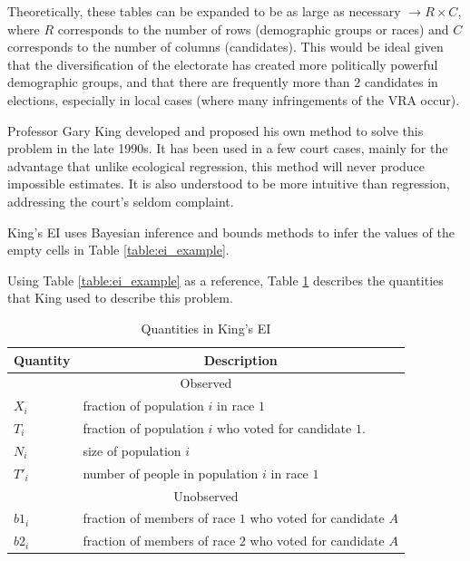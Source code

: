 Theoretically, these tables can be expanded to be as large as necessary $\rightarrow R \times C$, where $R$ corresponds to the number of rows (demographic groups or races) and $C$ corresponds to the number of columns (candidates). This would be ideal given that the diversification of the electorate has created more politically powerful demographic groups, and that there are frequently more than $2$ candidates in elections, especially in local cases (where many infringements of the VRA occur).

Professor Gary King developed and proposed his own method to solve this problem in the late 1990s. It has been used in a few court cases, mainly for the advantage that unlike ecological regression, this method will never produce impossible estimates. It is also understood to be more intuitive than regression, addressing the court's seldom complaint.

King's EI uses Bayesian inference and bounds methods to infer the values of the empty cells in Table \ref{table:ei_example}.

Using Table \ref{table:ei_example} as a reference, Table \ref{table:ei_quantities} describes the quantities that King used to describe this problem\cite{king1999}.

\begin{table}[ht]
 \centering
 \caption{Quantities in King's EI}
 \label{table:ei_quantities}
 \begin{tabular}{|l|l|}
  \hline
  \multicolumn{1}{|c|}{Quantity} & \multicolumn{1}{|c|}{Description}                           \\
  \hline
  \multicolumn{2}{|c|}{Observed}                                                               \\
  \hline
  $X_i$                          & fraction of population $i$ in race $1$                      \\
  $T_i$                          & fraction of population $i$ who voted for candidate $1$.     \\
  $N_i$                          & size of population $i$                                      \\
  $T'_i$                         & number of people in population $i$ in race $1$              \\
  \hline
  \multicolumn{2}{|c|}{Unobserved}                                                             \\
  \hline
  $b1_i$                         & fraction of members of race $1$ who voted for candidate $A$ \\
  $b2_i$                         & fraction of members of race $2$ who voted for candidate $A$ \\
  \hline
 \end{tabular}
\end{table}

